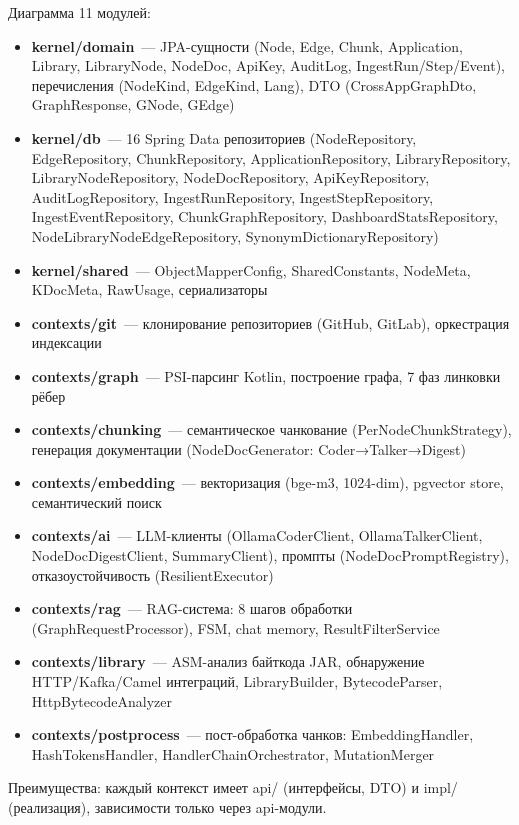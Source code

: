 {Диаграмма 11 модулей:
\begin{itemize}
  \item \textbf{kernel/domain}~--- JPA-сущности (Node, Edge, Chunk, Application, Library, LibraryNode, NodeDoc, ApiKey, AuditLog, IngestRun/Step/Event), перечисления (NodeKind, EdgeKind, Lang), DTO (CrossAppGraphDto, GraphResponse, GNode, GEdge)
  \item \textbf{kernel/db}~--- 16 Spring Data репозиториев (NodeRepository, EdgeRepository, ChunkRepository, ApplicationRepository, LibraryRepository, LibraryNodeRepository, NodeDocRepository, ApiKeyRepository, AuditLogRepository, IngestRunRepository, IngestStepRepository, IngestEventRepository, ChunkGraphRepository, DashboardStatsRepository, NodeLibraryNodeEdgeRepository, SynonymDictionaryRepository)
  \item \textbf{kernel/shared}~--- ObjectMapperConfig, SharedConstants, NodeMeta, KDocMeta, RawUsage, сериализаторы
  \item \textbf{contexts/git}~--- клонирование репозиториев (GitHub, GitLab), оркестрация индексации
  \item \textbf{contexts/graph}~--- PSI-парсинг Kotlin, построение графа, 7 фаз линковки рёбер
  \item \textbf{contexts/chunking}~--- семантическое чанкование (PerNodeChunkStrategy), генерация документации (NodeDocGenerator: Coder→Talker→Digest)
  \item \textbf{contexts/embedding}~--- векторизация (bge-m3, 1024-dim), pgvector store, семантический поиск
  \item \textbf{contexts/ai}~--- LLM-клиенты (OllamaCoderClient, OllamaTalkerClient, NodeDocDigestClient, SummaryClient), промпты (NodeDocPromptRegistry), отказоустойчивость (ResilientExecutor)
  \item \textbf{contexts/rag}~--- RAG-система: 8 шагов обработки (GraphRequestProcessor), FSM, chat memory, ResultFilterService
  \item \textbf{contexts/library}~--- ASM-анализ байткода JAR, обнаружение HTTP/Kafka/Camel интеграций, LibraryBuilder, BytecodeParser, HttpBytecodeAnalyzer
  \item \textbf{contexts/postprocess}~--- пост-обработка чанков: EmbeddingHandler, HashTokensHandler, HandlerChainOrchestrator, MutationMerger
\end{itemize}

Преимущества: каждый контекст имеет api/ (интерфейсы, DTO) и impl/ (реализация), зависимости только через api-модули.}


